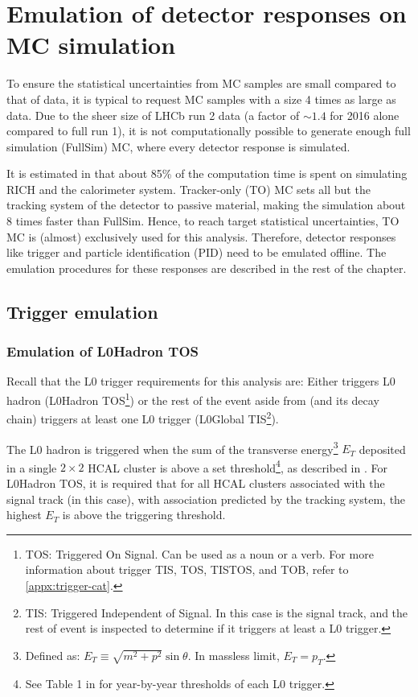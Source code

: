 \chapter{Emulation of detector responses on MC simulation}
\label{ref:mc-emulation}

To ensure the statistical uncertainties from MC samples are small compared to
that of data, it is typical to request MC samples with a size 4 times as large
as data.
Due to the sheer size of LHCb run 2 data (a factor of $\sim\!1.4$ for 2016
alone compared to full run 1), it is not computationally possible to generate
enough full simulation (FullSim) MC, where every detector response is simulated.

It is estimated in \cite{LHCb-INT-2019-025}
that about 85\% of the computation time is spent on simulating RICH and the
calorimeter system.
Tracker-only (TO) MC sets all but the tracking system of the detector to
passive material, making the simulation about 8 times faster than FullSim.
Hence, to reach target statistical uncertainties,
TO MC is (almost) exclusively used for this analysis.
Therefore, detector responses like trigger and particle identification (PID)
need to be emulated offline.
The emulation procedures for these responses are described in the rest of the
chapter.


\section{Trigger emulation}
\subsection{Emulation of L0Hadron TOS}

Recall that the L0 trigger requirements for this analysis are: Either \Dz
triggers L0 hadron (\Dz L0Hadron TOS\footnote{
    TOS: Triggered On Signal. Can be used as a noun or a verb.
    For more information about trigger TIS, TOS, TISTOS, and TOB, refer to
    \cref{appx:trigger-cat}.
}) or
the rest of the event aside from \B (and its decay chain) triggers at least
one L0 trigger
(\B L0Global TIS\footnote{
    TIS: Triggered Independent of Signal.
    In this case \B is the signal track, and the rest of event is inspected to
    determine if it triggers at least a L0 trigger.
}).

The L0 hadron is triggered when the sum of the transverse energy\footnote{
    Defined as: $E_T \equiv \sqrt{m^2 + p^2} \sin\theta$.
    In massless limit, $E_T = p_T$.
} $E_T$ deposited
in a single $2 \times 2$ HCAL cluster is above a set threshold\footnote{
    See Table 1 in \cite{LHCb-DP-2019-001} for year-by-year thresholds of each
    L0 trigger.
}, as described in \cite{LHCb-DP-2019-001}.
For L0Hadron TOS, it is required that for all HCAL clusters associated with the
signal track (\Dz in this case), with association predicted by the tracking
system,
the highest $E_T$ is above the triggering threshold.

